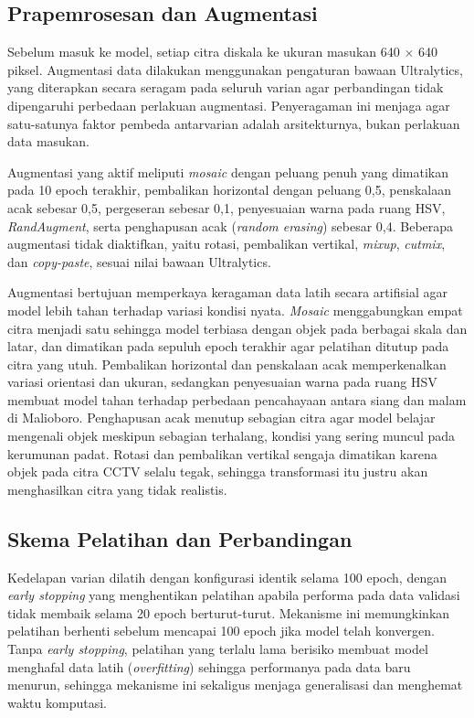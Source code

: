 \subsection{Prapemrosesan dan Augmentasi}

Sebelum masuk ke model, setiap citra diskala ke ukuran masukan 640 $\times$ 640 piksel. 
Augmentasi data dilakukan menggunakan pengaturan bawaan Ultralytics, yang diterapkan secara 
seragam pada seluruh varian agar perbandingan tidak dipengaruhi perbedaan perlakuan 
augmentasi. Penyeragaman ini menjaga agar satu-satunya faktor pembeda antarvarian adalah 
arsitekturnya, bukan perlakuan data masukan.

Augmentasi yang aktif meliputi \textit{mosaic} dengan peluang penuh yang dimatikan pada 
10 epoch terakhir, pembalikan horizontal dengan peluang 0,5, penskalaan acak sebesar 0,5, 
pergeseran sebesar 0,1, penyesuaian warna pada ruang HSV, \textit{RandAugment}, serta 
penghapusan acak (\textit{random erasing}) sebesar 0,4. Beberapa augmentasi tidak 
diaktifkan, yaitu rotasi, pembalikan vertikal, \textit{mixup}, \textit{cutmix}, dan 
\textit{copy-paste}, sesuai nilai bawaan Ultralytics.

Augmentasi bertujuan memperkaya keragaman data latih secara artifisial agar model lebih 
tahan terhadap variasi kondisi nyata. \textit{Mosaic} menggabungkan empat citra menjadi satu 
sehingga model terbiasa dengan objek pada berbagai skala dan latar, dan dimatikan pada 
sepuluh epoch terakhir agar pelatihan ditutup pada citra yang utuh. Pembalikan horizontal dan 
penskalaan acak memperkenalkan variasi orientasi dan ukuran, sedangkan penyesuaian warna pada 
ruang HSV membuat model tahan terhadap perbedaan pencahayaan antara siang dan malam di 
Malioboro. Penghapusan acak menutup sebagian citra agar model belajar mengenali objek 
meskipun sebagian terhalang, kondisi yang sering muncul pada kerumunan padat. Rotasi dan 
pembalikan vertikal sengaja dimatikan karena objek pada citra CCTV selalu tegak, sehingga 
transformasi itu justru akan menghasilkan citra yang tidak realistis.

\subsection{Skema Pelatihan dan Perbandingan}

Kedelapan varian dilatih dengan konfigurasi identik selama 100 epoch, dengan 
\textit{early stopping} yang menghentikan pelatihan apabila performa pada data validasi 
tidak membaik selama 20 epoch berturut-turut. Mekanisme ini memungkinkan pelatihan 
berhenti sebelum mencapai 100 epoch jika model telah konvergen. Tanpa \textit{early 
stopping}, pelatihan yang terlalu lama berisiko membuat model menghafal data latih 
(\textit{overfitting}) sehingga performanya pada data baru menurun, sehingga mekanisme ini 
sekaligus menjaga generalisasi dan menghemat waktu komputasi.

